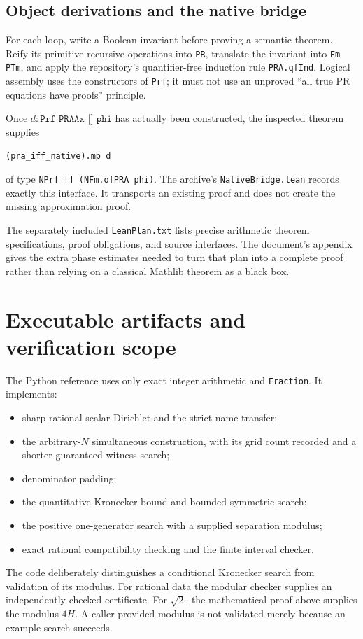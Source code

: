 \documentclass[11pt]{article}
\theoremstyle{definition}\newtheorem{definition}[theorem]{Definition}
\theoremstyle{remark}\newtheorem{remark}[theorem]{Remark}
\begin{document}
\subsection{Object derivations and the native bridge}

For each loop, write a Boolean invariant before proving a semantic theorem. Reify its primitive recursive operations into \texttt{PR}, translate the invariant into \texttt{Fm PTm}, and apply the repository's quantifier-free induction rule \texttt{PRA.qfInd}. Logical assembly uses the constructors of \texttt{Prf}; it must not use an unproved ``all true PR equations have proofs'' principle.

Once $d:\texttt{Prf PRAAx [] phi}$ has actually been constructed, the inspected theorem supplies
\begin{lstlisting}
(pra_iff_native).mp d
\end{lstlisting}
of type \texttt{NPrf [] (NFm.ofPRA phi)}. The archive's \texttt{NativeBridge.lean} records exactly this interface. It transports an existing proof and does not create the missing approximation proof.

The separately included \texttt{LeanPlan.txt} lists precise arithmetic theorem specifications, proof obligations, and source interfaces. The document's appendix gives the extra phase estimates needed to turn that plan into a complete proof rather than relying on a classical Mathlib theorem as a black box.

\section{Executable artifacts and verification scope}\label{sec:artifacts}

The Python reference uses only exact integer arithmetic and \texttt{Fraction}. It implements:
\begin{itemize}
\item sharp rational scalar Dirichlet and the strict name transfer;
\item the arbitrary-$N$ simultaneous construction, with its grid count recorded and a shorter guaranteed witness search;
\item denominator padding;
\item the quantitative Kronecker bound and bounded symmetric search;
\item the positive one-generator search with a supplied separation modulus;
\item exact rational compatibility checking and the finite interval checker.
\end{itemize}
The code deliberately distinguishes a conditional Kronecker search from validation of its modulus. For rational data the modular checker supplies an independently checked certificate. For $\sqrt2$, the mathematical proof above supplies the modulus $4H$. A caller-provided modulus is not validated merely because an example search succeeds.
\end{document}
